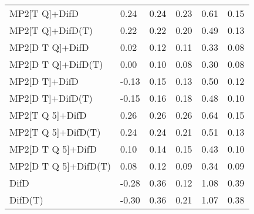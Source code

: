 \begin{table}
\begin{tabular}{l l l l l l }
    MP2[T Q]+DifD & 0.24 & 0.24 & 0.23 & 0.61 & 0.15 \\ 
    MP2[T Q]+DifD(T) & 0.22 & 0.22 & 0.20 & 0.49 & 0.13 \\ 
    MP2[D T Q]+DifD & 0.02 & 0.12 & 0.11 & 0.33 & 0.08 \\ 
    MP2[D T Q]+DifD(T) & 0.00 & 0.10 & 0.08 & 0.30 & 0.08 \\ 
    MP2[D T]+DifD & -0.13 & 0.15 & 0.13 & 0.50 & 0.12 \\ 
    MP2[D T]+DifD(T) & -0.15 & 0.16 & 0.18 & 0.48 & 0.10 \\ 
    MP2[T Q 5]+DifD & 0.26 & 0.26 & 0.26 & 0.64 & 0.15 \\ 
    MP2[T Q 5]+DifD(T) & 0.24 & 0.24 & 0.21 & 0.51 & 0.13 \\ 
    MP2[D T Q 5]+DifD & 0.10 & 0.14 & 0.15 & 0.43 & 0.10 \\ 
    MP2[D T Q 5]+DifD(T) & 0.08 & 0.12 & 0.09 & 0.34 & 0.09 \\ 
    DifD & -0.28 & 0.36 & 0.12 & 1.08 & 0.39 \\ 
    DifD(T) & -0.30 & 0.36 & 0.21 & 1.07 & 0.38 \\ 
    \bottomrule
  \end{tabular}
\end{table}
